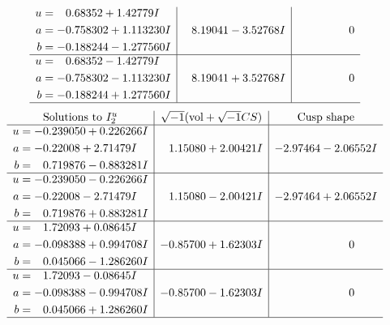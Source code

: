 \documentclass[1p]{elsarticle_modified}
\theoremstyle{definition}
\newcommand{\I}{\sqrt{-1}}
\begin{document}
$$\begin{array}{c|c|c}
\begin{aligned}
u &= \phantom{-}0.68352 + 1.42779 I \\
a &= -0.758302 + 1.113230 I \\
b &= -0.188244 - 1.277560 I\end{aligned}
 & \phantom{-}8.19041 - 3.52768 I & \phantom{-0.000000 } 0 \\ \hline\begin{aligned}
u &= \phantom{-}0.68352 - 1.42779 I \\
a &= -0.758302 - 1.113230 I \\
b &= -0.188244 + 1.277560 I\end{aligned}
 & \phantom{-}8.19041 + 3.52768 I & \phantom{-0.000000 } 0\\
 \hline 
 \end{array}$$\newpage$$\begin{array}{c|c|c}  
\text{Solutions to }I^u_{2}& \I (\text{vol} + \sqrt{-1}CS) & \text{Cusp shape}\\
 \hline 
\begin{aligned}
u &= -0.239050 + 0.226266 I \\
a &= -0.22008 + 2.71479 I \\
b &= \phantom{-}0.719876 - 0.883281 I\end{aligned}
 & \phantom{-}1.15080 + 2.00421 I & -2.97464 - 2.06552 I \\ \hline\begin{aligned}
u &= -0.239050 - 0.226266 I \\
a &= -0.22008 - 2.71479 I \\
b &= \phantom{-}0.719876 + 0.883281 I\end{aligned}
 & \phantom{-}1.15080 - 2.00421 I & -2.97464 + 2.06552 I \\ \hline\begin{aligned}
u &= \phantom{-}1.72093 + 0.08645 I \\
a &= -0.098388 + 0.994708 I \\
b &= \phantom{-}0.045066 - 1.286260 I\end{aligned}
 & -0.85700 + 1.62303 I & \phantom{-0.000000 } 0 \\ \hline\begin{aligned}
u &= \phantom{-}1.72093 - 0.08645 I \\
a &= -0.098388 - 0.994708 I \\
b &= \phantom{-}0.045066 + 1.286260 I\end{aligned}
 & -0.85700 - 1.62303 I & \phantom{-0.000000 } 0\\
 \hline 
 \end{array}$$\newpage
\end{document}
